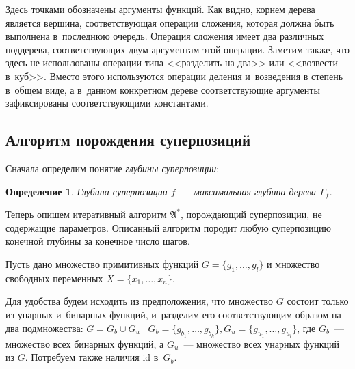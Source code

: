 \documentclass[12pt,a4paper]{article}
\newtheorem{defin}{Определение}
\begin{document}
Здесь точками обозначены аргументы функций. Как видно, корнем дерева является
вершина, соответствующая операции сложения, которая должна быть выполнена
в~последнюю очередь. Операция сложения имеет два различных поддерева,
соответствующих двум аргументам этой операции. Заметим также, что здесь не
использованы операции типа <<разделить на два>> или <<возвести в~куб>>.
Вместо этого используются операции деления и~возведения в степень в~общем
виде, а в~данном конкретном дереве соответствующие аргументы зафиксированы
соответствующими константами.

\subsection{Алгоритм порождения суперпозиций}

Сначала определим понятие \emph{глубины суперпозиции}:

\begin{defin}
  Глубина суперпозиции $f$~--- максимальная глубина дерева $\Gamma_f$.
\end{defin}

Теперь опишем итеративный алгоритм $\mathfrak{A^*}$, порождающий суперпозиции,
не содержащие параметров. Описанный алгоритм породит любую суперпозицию
конечной глубины за конечное число шагов.

Пусть дано множество примитивных функций $G = \{ g_1, \dots, g_l \}$ и
множество свободных переменных $X = \{ x_1, \dots, x_n \}$.

Для удобства будем исходить из предположения, что множество $G$ состоит
только из унарных и~бинарных функций, и~разделим его соответствующим образом
на два подмножества:
$G = G_b \cup G_u \mid G_b = \{ g_{b_1}, \dots, g_{b_k} \}, G_u = \{ g_{u_1}, \dots, g_{u_l} \}$,
где $G_b$~--- множество всех бинарных функций, а $G_u$~--- множество всех
унарных функций из $G$. Потребуем также наличия $\text{id}$ в~$G_b$.
\end{document}
